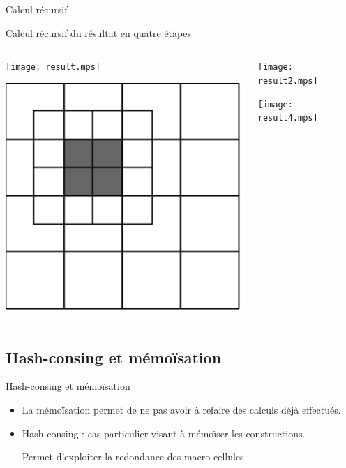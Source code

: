 \documentclass{beamer}
\begin{document}
\begin{frame}{Calcul récursif}
  \begin{center}
    Calcul récursif du résultat en quatre étapes 
  \end{center}

  \begin{columns}[c]

    \begin{column}{2cm}
      \texttt{[image: result.mps]}

      \medskip

      \includegraphics[scale=0.24]{result_3.png}
    \end{column}

    \begin{column}{2cm}
      \texttt{[image: result2.mps]}

      \medskip

      \texttt{[image: result4.mps]}
    \end{column}

  \end{columns}

\end{frame}

\subsection{Hash-consing et mémoïsation}

\begin{frame}{Hash-consing et mémoïsation}

\begin{itemize}
\item La mémoïsation permet de ne pas avoir à refaire des
  calculs déjà effectués.
\item Hash-consing : cas particulier visant à mémoïser les
  constructions. 

\bigskip
  Permet d'exploiter la redondance des macro-cellules
\end{itemize}

\end{frame}
\end{document}
